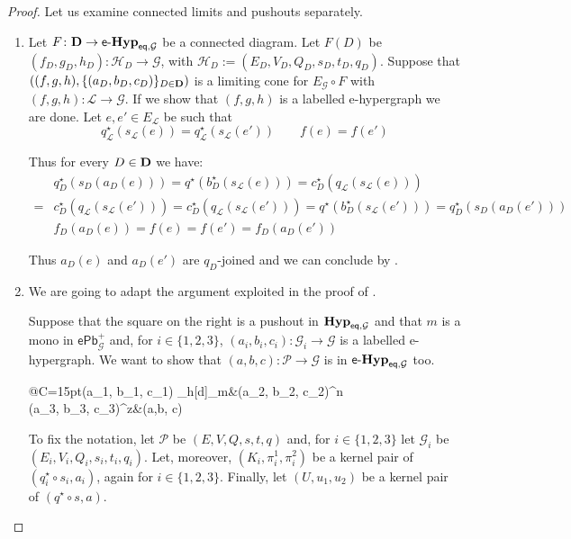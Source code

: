 \documentclass[3p]{elsarticle}
\newcommand{\pbe}{\mathsf{ePb}^{+}}
\newcommand{\eq}{\mathsf{eq}}
\def\D{\textbf {\textup{D}}}
\newcommand{\catname}[1]{\textbf{\textup{#1}}}
\newcommand{\hyp}{\catname{Hyp}}
\newcommand{\eggl}{\mathsf{e}\text{-}\catname{Hyp}_{\eq, \mathcal{G}}}
\theoremstyle{remark}
\theoremstyle{definition}
\begin{document}
\varie*


\begin{proof}\label{proof:varie}
	Let us examine connected limits and pushouts separately.
	\begin{enumerate}
		\item Let $F\colon \D\to \eggl$ be a connected diagram. Let $F(D)$ be $(f_D,g_D,h_D)\colon \mathcal{H}_D\to \mathcal{G}$, with $ \mathcal{H}_D:=(E_D, V_D, Q_D, s_D, t_D, q_D)$. Suppose that $((f,g,h), \{(a_D, b_D, c_D)\}_{D\in \D})$ is a limiting cone for $E_{\mathcal{G}}\circ F$ with $(f,g,h)\colon \mathcal{L}\to \mathcal{G}$. If we show that $(f,g,h)$ is a labelled e-hypergraph we are done. Let $e, e'\in E_{\mathcal{L}}$ be such that
		\[q^\star_{\mathcal{L}}(s_{\mathcal{L}}(e))=q^\star_{\mathcal{L}}(s_{\mathcal{L}}(e')) \qquad f(e)=f(e')\]
		
		 Thus for every $D\in \D$ we have:
		\begin{align*}
			&q^\star_D(s_D(a_D(e)))=q^\star(b^\star_D(s_{\mathcal{L}}(e)))=c^\star_D(q_{\mathcal{L}}(s_{\mathcal{L}}(e)))\\=&c^\star_D(q_{\mathcal{L}}(s_{\mathcal{L}}(e')))=c^\star_D(q_{\mathcal{L}}(s_{\mathcal{L}}(e')))=q^\star(b^\star_D(s_{\mathcal{L}}(e')))=q^\star_D(s_D(a_D(e')))\\
			&f_D(a_D(e)) = f(e)=f(e')= f_D(a_D(e'))
		\end{align*}
		
		Thus $a_D(e)$ and $a_D(e')$ are $q_D$-joined and we can conclude by .
		\item We are going to adapt the argument exploited in the proof of .
		
		\noindent 
		\begin{minipage}[l]{.73\linewidth}
				Suppose that the square on the right is a pushout in $\hyp_{\eq, \mathcal{G}}$ and that $m$ is a mono in $\pbe_{\mathcal{G}}$ and, for $i\in \{1,2,3\}$, $(a_i,b_i,c_i)\colon \mathcal{G}_i\to \mathcal{G}$ is a labelled e-hypergraph. We want to show that $(a,b,c)\colon \mathcal{P}\to \mathcal{G}$ is in $\eggl$ too.
		\end{minipage}\hfill 
		\begin{minipage}[r]{.15\linewidth}
			\xymatrix@R=10pt@C=15pt{(a_1, b_1, c_1) \ar[r]_{h}\ar@{>->}[d]_{m}&(a_2, b_2, c_2)\ar[d]^{n}\\(a_3, b_3, c_3)\ar[r]^{z}&(a,b, c)}
		\end{minipage}
		

		To fix the notation, let $\mathcal{P} $ be $(E, V, Q, s, t, q)$ and, for $i\in \{1, 2, 3\}$ let $\mathcal{G}_i$ be $(E_{i}, V_i, Q_i, s_i, t_i, q_i)$.  Let, moreover, $(K_i, \pi_i^1, \pi_i^2)$
		be a kernel pair of $(q_i^\star \circ s_i, a_i)$, again for $i\in \{1, 2, 3\}$. Finally, let $(U, u_1, u_2)$ be a kernel pair of $(q^\star \circ s, a)$. 
		

\end{enumerate}
\end{proof}
\end{document}
